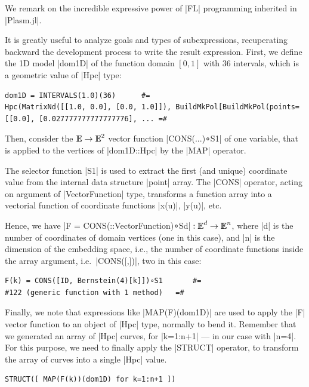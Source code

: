 \begin{coding}
We remark on the incredible expressive power of |FL| programming inherited in |Plasm.jl|.

It is greatly useful to analyze goals and types of subexpressions, recuperating backward the development process to  write the result expression.
First, we define the 1D model |dom1D| of the function domain $[0,1]$ with 36 intervals, which is a geometric value of |Hpc| type:

\begin{lstlisting}[language=JuliaLocal, style=julia]
dom1D = INTERVALS(1.0)(36)  	#=
Hpc(MatrixNd([[1.0, 0.0], [0.0, 1.0]]), BuildMkPol[BuildMkPol(points=[[0.0], [0.027777777777777776], ... =#
\end{lstlisting}

Then, consider the $\mathbb{I\!\!E}\to\mathbb{I\!\!E}^2$ vector function |CONS(...)∘S1| of one variable, that is applied to the vertices of |dom1D::Hpc| by the |MAP| operator. 

The selector function |S1| is used to extract the first (and unique) coordinate value from the internal data structure |point| array. The |CONS| operator, acting on argument of |Vector{Function}| type, transforms a  function array into a vectorial function of coordinate functions |x(u)|, |y(u)|, etc. 

Hence, we have |F = CONS(::Vector{Function})∘Sd|${} : \mathbb{I\!\!E}^d\to\mathbb{I\!\!E}^n$, where |d| is the number of coordinates of domain vertices (one in this case), and |n| is the dimension of the embedding space, i.e., the number of coordinate functions inside the array argument, i.e.~|CONS([,])|, two in this case:

\begin{lstlisting}[language=JuliaLocal, style=julia]
F(k) = CONS([ID, Bernstein(4)[k]])∘S1		#=
#122 (generic function with 1 method)	=#
\end{lstlisting}

Finally, we note that expressions like |MAP(F)(dom1D)| are used to apply the |F| vector function to an object of |Hpc| type, normally to bend it.
Remember that we  generated an array of |Hpc| curves, for |k=1:n+1| --- in our case with |n=4|. For this purpose, we need to finally apply the |STRUCT| operator, to transform the array of curves into a single |Hpc| value.
\begin{lstlisting}[language=JuliaLocal, style=julia]
STRUCT([ MAP(F(k))(dom1D) for k=1:n+1 ])
\end{lstlisting}

\end{coding}


